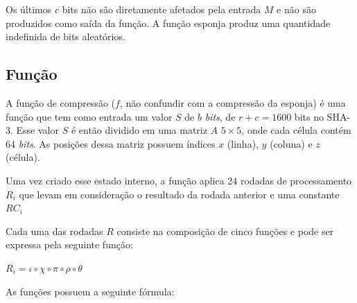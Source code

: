 Os últimos $c$ bits não são diretamente afetados pela entrada $M$ e não são
produzidos como saída da função. A função esponja produz uma quantidade
indefinida de bits aleatórios.

\subsection{Função \Keccak}

A função de compressão \Keccak{} ($f$, não confundir com a compressão da esponja)
é uma função que tem como entrada um valor $S$ de $b$ \textit{bits}, de
$r + c = 1600$ bits no SHA-3. Esse valor $S$ é então dividido em uma matriz $A$
$5 \times 5$, onde cada célula contém 64 \textit{bits}. As posições dessa
matriz possuem índices $x$ (linha), $y$ (coluna) e $z$ (célula).

Uma vez criado esse estado interno, a função aplica 24 rodadas de processamento
$R_{i}$ que levam em consideração o resultado da rodada anterior e uma
constante $RC_{i}$

Cada uma das rodadas $R$ consiste na composição de cinco funções e pode ser
expressa pela seguinte função:

\begin{center}
    $R_{i} = \iota \circ \chi \circ \pi \circ \rho \circ \theta$
\end{center}

As funções possuem a seguinte fórmula:

